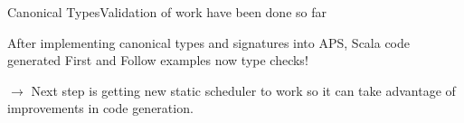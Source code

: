 \begin{frame}{Canonical Types}{Validation of work have been done so far}
    
After implementing canonical types and signatures into APS, Scala code generated First and Follow examples \alert{now type checks}!

\newlinevspace

$\to$ Next step is getting new \alert{static scheduler} to work so it can take advantage of improvements in code generation.

\end{frame}